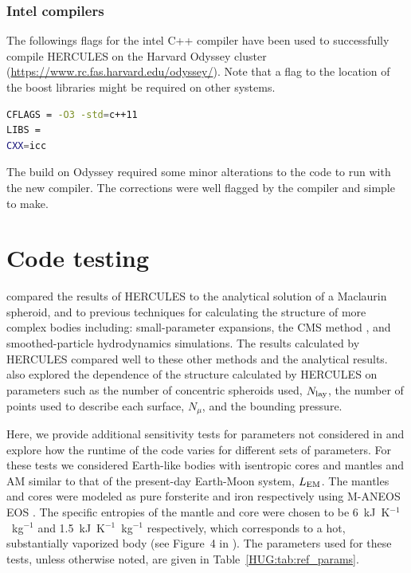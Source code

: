 \documentclass[11pt, oneside]{article}   	%
\begin{document}
\subsubsection{Intel compilers}

The followings flags for the intel C++ compiler have been used to successfully compile HERCULES on the Harvard Odyssey cluster (\url{https://www.rc.fas.harvard.edu/odyssey/}).
Note that a flag to the location of the boost libraries might be required on other systems. \\

\begin{lstlisting}[language=bash]
CFLAGS = -O3 -std=c++11 
LIBS = 
CXX=icc
\end{lstlisting}

The build on Odyssey required some minor alterations to the code to run with the new compiler. 
The corrections were well flagged by the compiler and simple to make.

\section{Code testing}
\label{HUG:sec:testing}

\citet{Lock2017} compared the results of HERCULES to the analytical solution of a Maclaurin spheroid, and to previous techniques for calculating the structure of more complex bodies including: small-parameter expansions, the CMS method \citep{Hubbard2013}, and smoothed-particle hydrodynamics simulations. The results calculated by HERCULES compared well to these other methods and the analytical results. \citet{Lock2017} also explored the dependence of the structure calculated by HERCULES on parameters such as the number of concentric spheroids used, $N_{\rm lay}$, the number of points used to describe each surface, $N_{\mu}$, and the bounding pressure. 

Here, we provide additional sensitivity tests for parameters not considered in \citet{Lock2017} and explore how the runtime of the code varies for different sets of parameters. For these tests we considered Earth-like bodies with isentropic cores and mantles and AM similar to that of the present-day Earth-Moon system, $L_{\rm EM}$. The mantles and cores were modeled as pure forsterite and iron respectively using M-ANEOS EOS \citep{Melosh2007,Canup2012}. The specific entropies of the mantle and core were chosen to be 6~kJ~K$^{-1}$~kg$^{-1}$ and 1.5~kJ~K$^{-1}$~kg$^{-1}$ respectively, which corresponds to a hot, substantially vaporized body (see Figure~4 in \citet{Lock2017}). The parameters used for these tests, unless otherwise noted, are given in Table~\ref{HUG:tab:ref_params}.
\end{document}

